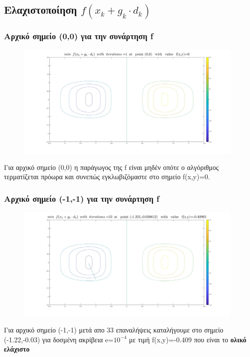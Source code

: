 \documentclass{article}
\begin{document}
 

\newpage

\subsection*{Ελαχιστοποίηση $f(x_k+g_k \cdot d_k )$}
\subsubsection*{Αρχικό σημείο (0,0) για την συνάρτηση f}
\begin{figure}[h!]	
     \centering  
     \advance\leftskip-0.2cm  
  \includegraphics[width=130mm,scale=2]{mfa.jpg}
\end{figure} 
Για αρχικό σημείο (0,0) η παράγωγος της f είναι μηδέν οπότε ο αλγόριθμος τερματίζεται πρόωρα και συνεπώς εγκλωβιζόμαστε στο σημείο f(x,y)=0.
 \subsubsection*{Αρχικό σημείο (-1,-1) για την συνάρτηση f}
\begin{figure}[h!]	
     \centering  
     \advance\leftskip-0.2cm  
  \includegraphics[width=130mm,scale=2]{mfb.jpg}
\end{figure} 
Για αρχικό σημείο (-1,-1) μετά απο 33 επαναλήψεις καταλήγουμε στο σημείο (-1.22,-0.03) για  δοσμένη ακρίβεια e=$10^{-4}$ με τιμή f(x,y)=-0.409 που είναι  το \textbf{ολικό ελάχιστο}
\newpage
\end{document}
